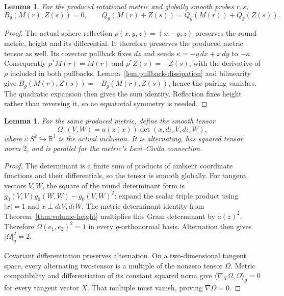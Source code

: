 \documentclass[11pt]{article}
\newtheorem{lemma}[theorem]{Lemma}
\begin{document}
\begin{lemma}\label{lem:zonal-orthogonality}
For the produced rotational metric and globally smooth probes $r,s$,
\[
 B_g(M(r),Z(s))=0,\qquad
 Q_g(M(r)+Z(s))=Q_g(M(r))+Q_g(Z(s)).
\]
\end{lemma}

\begin{proof}
The actual sphere reflection $\rho(x,y,z)=(x,-y,z)$ preserves the round
metric, height and its differential. It therefore preserves the produced
metric tensor as well. Its covector pullback fixes $dz$ and sends
$\kappa=-y\,dx+x\,dy$ to $-\kappa$. Consequently $\rho^*M(r)=M(r)$
and $\rho^*Z(s)=-Z(s)$, with the derivative of $\rho$ included in both
pullbacks. Lemma~\ref{lem:pullback-dissipation} and bilinearity give
$B_g(M(r),Z(s))=-B_g(M(r),Z(s))$, hence the pairing vanishes.
The quadratic expansion then gives the sum identity. Reflection fixes
height rather than reversing it, so no equatorial symmetry is needed.
\end{proof}

\begin{lemma}\label{lem:parallel-area}
For the same produced metric, define the smooth tensor
\[
 \Omega_x(V,W)=a(z(x))\det(x,d\iota_xV,d\iota_xW),
\]
where $\iota:S^2\hookrightarrow\mathbb R^3$ is the actual inclusion.
It is alternating, has squared tensor norm $2$, and is parallel for
the metric's Levi--Civita connection.
\end{lemma}

\begin{proof}
The determinant is a finite sum of products of ambient coordinate
functions and their differentials, so the tensor is smooth globally.
For tangent vectors $V,W$, the square of the round determinant form is
$g_0(V,V)g_0(W,W)-g_0(V,W)^2$: expand the scalar triple product using
$|x|=1$ and $x\perp d\iota V,d\iota W$. The metric determinant identity
from Theorem~\ref{thm:volume-height} multiplies this Gram determinant
by $a(z)^2$. Therefore $\Omega(e_1,e_2)^2=1$ in every $g$-orthonormal
basis. Alternation then gives $|\Omega|_g^2=2$.

Covariant differentiation preserves alternation. On a two-dimensional
tangent space, every alternating two-tensor is a multiple of the
nonzero tensor $\Omega$. Metric compatibility and differentiation of
its constant squared norm give
$\langle\nabla_X\Omega,\Omega\rangle_g=0$ for every tangent vector $X$.
That multiple must vanish, proving $\nabla\Omega=0$.
\end{proof}
\end{document}
